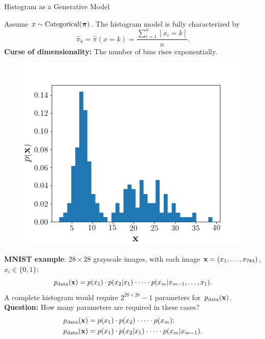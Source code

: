 \documentclass{beamer}
\begin{document}
\begin{frame}{Histogram as a Generative Model}
	
	\begin{minipage}[t]{0.6\columnwidth}
	    Assume $x \sim \mathrm{Categorical}(\boldsymbol{\pi})$. The histogram model is fully characterized by
		$$
		    \hat{\pi}_k = \hat{\pi}(x = k) = \frac{\sum_{i=1}^n [x_i = k]}{n}.
		$$
		\textbf{Curse of dimensionality:} The number of bins rises exponentially. \\
	\end{minipage}%
	\begin{minipage}[t]{0.4\columnwidth}
		\vspace{-0.5cm}
	    \begin{figure}[h]
	        \centering
	        \includegraphics[width=\linewidth]{figs/histogram.png}
	    \end{figure}
	\end{minipage}
    \eqpause
	\textbf{MNIST example}: $28 \times 28$ grayscale images, with each image $\mathbf{x} = (x_1, \dots, x_{784})$, $x_i \in \{0, 1\}$:
	$$
	    p_{\text{data}}(\mathbf{x}) = p(x_1) \cdot p(x_2 | x_1) \cdot \dots \cdot p(x_m | x_{m-1}, \dots, x_1).
	$$
    \eqpause
	A complete histogram would require $2^{28 \times 28} - 1$ parameters for~$p_{\text{data}}(\mathbf{x})$.\\
    \eqpause
	\textbf{Question:} How many parameters are required in these cases?
	\begin{align*}
	    p_{\text{data}}(\mathbf{x}) &= p(x_1) \cdot p(x_2)\cdot \dots \cdot p(x_m); \\
	    p_{\text{data}}(\mathbf{x}) &= p(x_1) \cdot p(x_2 | x_1) \cdot \dots \cdot p(x_m | x_{m-1}).
	\end{align*}
\end{frame}
\end{document}
